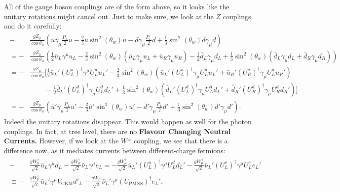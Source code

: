 \documentclass[relqm.tex]{subfiles}
\begin{document}
All of the gauge boson couplings are of the form above, so it looks like the unitary rotations might cancel out. 
Just to make sure, we look at the $Z$ couplings and do it carefully:
\begin{align}
    \begin{split}
        -&\frac{gZ_\mu}{\cos\theta_w}\left(\bar{u}\gamma_\mu\frac{P_L}{2}u - \frac23\bar{u}\sin^2(\theta_w)u - \bar{d}\gamma_\mu\frac{P_L}{2}d + \frac13\sin^2(\theta_w)\bar{d}\gamma_\mu d\right) \\
       =-&\frac{gZ_\mu}{\cos\theta_w}\left(\frac12\bar{u}_L\gamma^\mu u_L - \frac23\sin^2(\theta_w)(\bar{u}_L\gamma_\mu u_L + \bar{u}_R\gamma_\mu u_R) - \frac12\bar{d}_L\gamma_\mu d_L + \frac13\sin^2(\theta_w)(\bar{d}_L\gamma_\mu d_L + \bar{d}_R\gamma_\mu d_R)\right) \\
       =-&\frac{gZ_\mu}{\cos\theta_w}\bigg[\frac12\bar{u}_L'(U_L^u)^\dagger\gamma^\mu U_L^uu_L' - \frac23\sin^2(\theta_w)\left(\bar{u}_L'(U_L^u)^\dagger\gamma_\mu U_L^uu_L'+\bar{u}_R'(U_R^u)^\dagger\gamma_\mu U_L^uu_R'\right) \\
         &\quad\quad\, -\frac12\bar{d}_L'(U_L^d)^\dagger\gamma_\mu U_L^dd_L' + \frac13\sin^2(\theta_w)\left(\bar{d}_L'(U_L^d)^\dagger\gamma_\mu U_L^dd_L' + \bar{d}_R'(U_R^d)^\dagger\gamma_\mu U_R^dd_R'\right)\bigg] \\
       =-&\frac{gZ_\mu}{\cos\theta_w}\left(\bar{u}'\gamma_\mu\frac{P_L}{2}u' - \frac23\bar{u}'\sin^2(\theta_w)u' - \bar{d}'\gamma_\mu\frac{P_L}{2}d' + \frac13\sin^2(\theta_w)\bar{d}'\gamma_\mu d'\right).
    \end{split}
\end{align}
Indeed the unitary rotations disappear. 
This would happen as well for the photon couplings. 
In fact, at tree level, there are no \textbf{Flavour Changing Neutral Currents.}
However, if we look at the $W^\pm$ coupling, we see that there is a difference now, as it mediates currents between different-charge fermions:
\begin{align}
    \begin{split}
        -&\frac{gW_\mu^+}{\sqrt{2}}\bar{u}_L\gamma^\mu d_L - \frac{gW_\mu^+}{\sqrt{2}}\bar{\nu}_L\gamma^\mu e_L = -\frac{gW_\mu^+}{\sqrt{2}}\bar{u}_L'(U_L^u)^\dagger\gamma^\mu U_L^dd_L' - \frac{gW_\mu^+}{\sqrt{2}}\bar{\nu}_L'(U_L^\nu)^\dagger\gamma^\mu U_L^ee_L' \\
        \equiv-&\frac{gW_\mu^+}{\sqrt{2}}\bar{u}_L'\gamma^\mu V_{\text{CKM}}d'_L - \frac{gW_\mu^+}{\sqrt{2}}\bar{\nu}_L'\gamma^\mu(U_{\text{PMNS}})^\dagger e_L'.
    \end{split}
\end{align}
\end{document}
